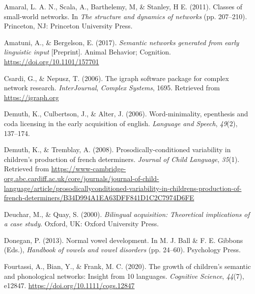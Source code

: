 \documentclass[
  man]{apa6}
\newlength{\cslhangindent}
\newlength{\cslentryspacingunit} %
\newenvironment{CSLReferences}[2] %
 {%
  \setlength{\parindent}{0pt}
  \ifodd #1
  \let\oldpar\par
  \def\par{\hangindent=\cslhangindent\oldpar}
  \fi
  \setlength{\parskip}{#2\cslentryspacingunit}
 }%
 {}
\begin{document}
\hypertarget{refs}{}
\begin{CSLReferences}{1}{0}
\leavevmode{}%
Amaral, L. A. N., Scala, A., Barthelemy, M, \& Stanley, H E. (2011). Classes of small-world networks. In \emph{The structure and dynamics of networks} (pp. 207--210). Princeton, {NJ}: Princeton University Press.

\leavevmode{}%
Amatuni, A., \& Bergelson, E. (2017). \emph{Semantic networks generated from early linguistic input} {[}Preprint{]}. Animal Behavior; Cognition. \url{https://doi.org/10.1101/157701}

\leavevmode{}%
Csardi, G., \& Nepusz, T. (2006). The igraph software package for complex network research. \emph{InterJournal}, \emph{Complex Systems}, 1695. Retrieved from \url{https://igraph.org}

\leavevmode{}%
Demuth, K., Culbertson, J., \& Alter, J. (2006). Word-minimality, epenthesis and coda licensing in the early acquisition of english. \emph{Language and Speech}, \emph{49}(2), 137--174.

\leavevmode{}%
Demuth, K., \& Tremblay, A. (2008). Prosodically-conditioned variability in children's production of french determiners. \emph{Journal of Child Language}, \emph{35}(1). Retrieved from \url{https://www-cambridge-org.abc.cardiff.ac.uk/core/journals/journal-of-child-language/article/prosodicallyconditioned-variability-in-childrens-production-of-french-determiners/B34D994A1EA63DFF841D1C2C7974D6FE}

\leavevmode{}%
Deuchar, M., \& Quay, S. (2000). \emph{Bilingual acquisition: Theoretical implications of a case study}. Oxford, {UK}: Oxford University Press.

\leavevmode{}%
Donegan, P. (2013). Normal vowel development. In M. J. Ball \& F. E. Gibbons (Eds.), \emph{Handbook of vowels and vowel disorders} (pp. 24--60). Psychology Press.

\leavevmode{}%
Fourtassi, A., Bian, Y., \& Frank, M. C. (2020). The growth of children's semantic and phonological networks: Insight from 10 languages. \emph{Cognitive Science}, \emph{44}(7), e12847. \url{https://doi.org/10.1111/cogs.12847}


\end{CSLReferences}
\end{document}
